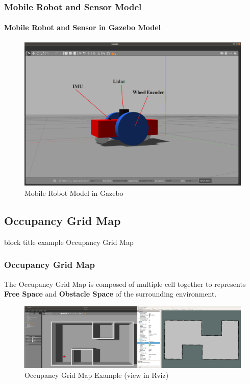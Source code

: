 \begin{frame}
	\frametitle{Mobile Robot and Sensor Model}
	\framesubtitle{Mobile Robot and Sensor in Gazebo Model}
	\begin{figure}
		\caption{Mobile Robot Model in Gazebo}
		\includegraphics[scale=0.2]{image/Gazebo_sim.png}
	\end{figure}
\end{frame}



\begin{frame}
	\subsection{Occupancy Grid Map}
	\begin{beamercolorbox}[rounded=true]{block title example}
		\centering
		\LARGE
		Occupancy Grid Map
	\end{beamercolorbox}
\end{frame}



\begin{frame}
	\frametitle{Occupancy Grid Map}
	The Occupancy Grid Map is composed of multiple cell together to represents \textbf{Free Space} and \textbf{Obstacle Space} of the surrounding environment.
	\begin{figure}[h]
		\caption{Occupancy Grid Map Example (view in Rviz)}
		\includegraphics[scale=0.17]{image/map_ex_rviz.png}
	\end{figure}
\end{frame}


